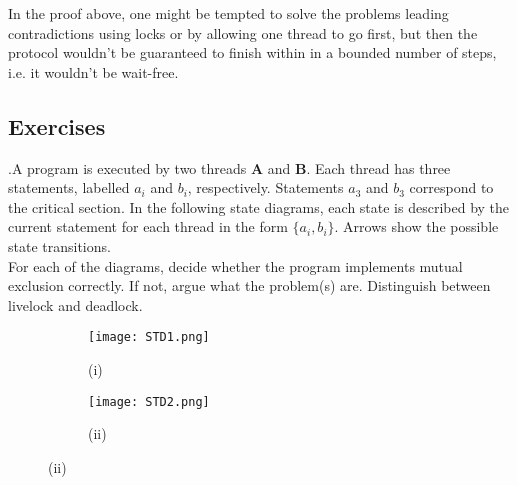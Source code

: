 \documentclass[main]{subfiles}
\begin{document}
In the proof above, one might be tempted to solve the problems leading contradictions using locks or by allowing one thread to go first, but then the protocol wouldn't be guaranteed to finish within in a bounded number of steps, i.e. it wouldn't be wait-free.
 
\newpage


\subsection{Exercises}
    \begin{ExerciseList}
        
        \Exercise[title={Mutual Exclusion},label=MEI].\quad A program is executed by two threads \textbf{A} and \textbf{B}. Each thread has three statements, labelled $a_i$ and $b_i$, respectively. Statements $a_3$ and $b_3$ correspond to the critical section. In the following state diagrams, each state is described by the current statement for each thread in the form $\{a_i,b_i\}$. Arrows show the possible state transitions.\\[3mm] 
        For each of the diagrams, decide whether the program implements mutual exclusion correctly. If not, argue what the problem(s) are. Distinguish between livelock and deadlock.
                
            \begin{figure}[H]
                \centering
                \begin{subfigure}{.5\textwidth}
                    \centering
                    \texttt{[image: STD1.png]}
                    \captionsetup{labelformat=empty}
                    \caption{(i)}
                \end{subfigure}%
                \begin{subfigure}{.5\textwidth}
                    \centering
                    \texttt{[image: STD2.png]}
                    \captionsetup{labelformat=empty}
                    \caption{(ii)}
                \end{subfigure}
            \end{figure}
            

\end{ExerciseList}
\end{document}
